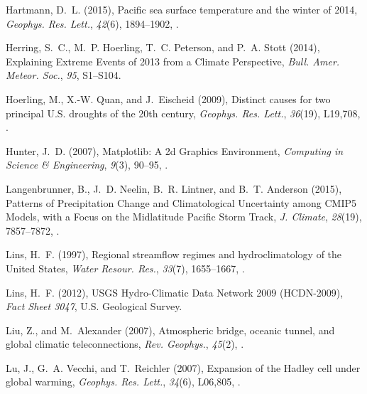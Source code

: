 \documentclass[final, double]{ua-thesis}
\begin{document}
\begin{thebibliography}{59}
Hartmann, D.~L. (2015), Pacific sea surface temperature and the winter of 2014,
  \textit{Geophys. Res. Lett.}, \textit{42}(6), 1894--1902,
  .

Herring, S.~C., M.~P. Hoerling, T.~C. Peterson, and P.~A. Stott (2014),
  Explaining {Extreme} {Events} of 2013 from a {Climate} {Perspective},
  \textit{Bull. Amer. Meteor. Soc.}, \textit{95}, S1--S104.

Hoerling, M., X.-W. Quan, and J.~Eischeid (2009), Distinct causes for two
  principal {U}.{S}. droughts of the 20th century, \textit{Geophys. Res.
  Lett.}, \textit{36}(19), L19,708, .

Hunter, J.~D. (2007), Matplotlib: {A} 2d {Graphics} {Environment},
  \textit{Computing in Science \& Engineering}, \textit{9}(3), 90--95,
  .

Langenbrunner, B., J.~D. Neelin, B.~R. Lintner, and B.~T. Anderson (2015),
  Patterns of {Precipitation} {Change} and {Climatological} {Uncertainty} among
  {CMIP}5 {Models}, with a {Focus} on the {Midlatitude} {Pacific} {Storm}
  {Track}, \textit{J. Climate}, \textit{28}(19), 7857--7872,
  .


Lins, H.~F. (1997), Regional streamflow regimes and hydroclimatology of the
  {United} {States}, \textit{Water Resour. Res.}, \textit{33}(7), 1655--1667,
  .

Lins, H.~F. (2012), {USGS} {Hydro}-{Climatic} {Data} {Network} 2009
  ({HCDN}-2009), \textit{Fact {Sheet} 3047}, U.S. Geological Survey.

Liu, Z., and M.~Alexander (2007), Atmospheric bridge, oceanic tunnel, and
  global climatic teleconnections, \textit{Rev. Geophys.}, \textit{45}(2),
  .

Lu, J., G.~A. Vecchi, and T.~Reichler (2007), Expansion of the {Hadley} cell
  under global warming, \textit{Geophys. Res. Lett.}, \textit{34}(6), L06,805,
  .


\end{thebibliography}
\end{document}
